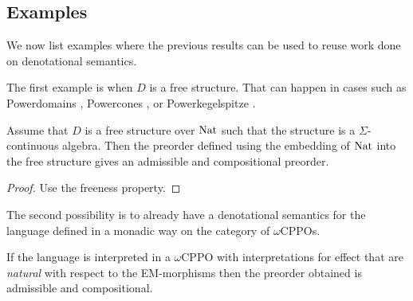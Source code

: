 \subsection{Examples}

We now list examples where the previous results can be used 
to reuse work done on denotational semantics.

The first example is when $D$ is a free structure. That 
can happen in cases such as Powerdomains 
\cite{abramsky1994}, Powercones \cite{tix2009semantic}, 
or Powerkegelspitze \cite{KeimelP2016}.

\begin{example}
    Assume that $D$ is a free structure 
    over $\textnormal{Nat}$ such that the structure 
    is a $\Sigma$-continuous algebra.
    Then the preorder defined using the embedding 
    of $\textnormal{Nat}$ into the free structure gives 
    an admissible and compositional preorder.
\end{example}

\begin{ensps}
    \begin{proof}
        Use the freeness property.
    \end{proof}
\end{ensps}

The second possibility is to already have a denotational semantics 
for the language defined in a monadic way on the category of $\omega$CPPOs.

\begin{example}
    If the language is interpreted in a $\omega$CPPO with 
    interpretations for effect that are \emph{natural}
    with respect to the EM-morphisms then the
    preorder obtained is admissible and compositional.
\end{example}

